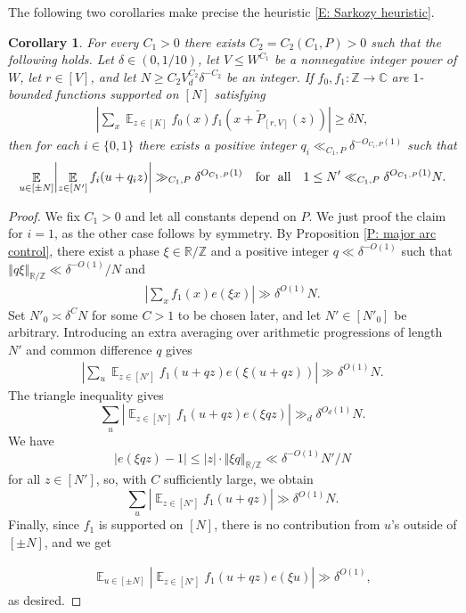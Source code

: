 \documentclass[11pt]{amsart}
\newtheorem{corollary}[lemma]{Corollary}
\theoremstyle{definition}
\DeclareMathOperator*{\E}{\mathbb{E}}
\newcommand{\C}{{\mathbb C}}
\newcommand{\R}{{\mathbb R}}
\newcommand{\Z}{{\mathbb Z}}
\newcommand{\norm}[1]{\left\Vert #1\right\Vert}
\newcommand{\abs}[1]{\mathopen{}\left| #1\mathclose{}\right|}
\begin{document}
The following two corollaries make precise the heuristic \eqref{E: Sarkozy heuristic}.
\begin{corollary}\label{C: 1-dim Sarkozy}
        For every $C_1>0$ there exists $C_2 = C_2(C_1, P)>0$ such that the following holds. Let $\delta\in(0, 1/10)$, let $V\leq W^{C_1}$ be a nonnegative integer power of $W$, let $r\in[V]$, and let $N\geq C_2 V_d^{C_2}\delta^{-C_2}$ be an integer. If $f_0, f_1:\Z\to\C$ are $1$-bounded functions supported on $[N]$ satisfying
    \begin{align*}
        \abs{\sum_x \E_{z\in[K]}f_0(x) f_1(x+\widetilde{P}_{[r, V]}(z))}\geq \delta N,
    \end{align*}
    then for each $i\in\{0,1\}$ there exists a positive integer  $q_i\ll_{C_1, P} \delta^{-O_{C_1, P}(1)}$ such that %
    \begin{align*}
        \E_{u\in [\pm N]}\abs{\E_{z\in[N']} f_i(u + q_i z)}\gg_{C_1, P} \delta^{O_{C_1, P}(1)} \quad\textrm{for\; all}\quad 1\leq N'\ll_{C_1, P} \delta^{O_{C_1, P}(1)} N.
    \end{align*}
\end{corollary}
\begin{proof}
    We fix $C_1>0$ and let all constants depend on $P$. We just proof the claim for $i=1$, as the other case follows by symmetry. By Proposition \ref{P: major arc control}, there exist a phase $\xi\in\R/\Z$ and a positive integer $q\ll \delta^{-O(1)}$ such that $\norm{q\xi}_{\R/\Z}\ll\delta^{-O(1)}/N$ 
    and 
    \begin{align*}
        \abs{\sum_x f_1(x)e(\xi x)}\gg \delta^{O(1)}N.
    \end{align*}
    Set $N'_0 \asymp \delta^C N$ for some $C>1$ to be chosen later, and let $N'\in[N'_0]$ be arbitrary. Introducing an extra averaging over arithmetic progressions of length $N'$ and common difference $q$ gives
    \begin{align*}
        \abs{\sum_{u}\E_{z\in[N']} f_1(u+qz)e(\xi (u+qz))}\gg \delta^{O(1)}N.
    \end{align*} 
    The triangle inequality gives
    $$\sum_u \abs{\E_{z\in[N']} f_1(u+qz)e(\xi qz)}\gg_d \delta^{O_d(1)}N.$$
    We have
    $$|e(\xi qz)-1| \leq |z| \cdot \norm{\xi q}_{\R/\Z}\ll \delta^{-O(1)}N'/N$$
    for all $z \in [N']$, so, with $C$ sufficiently large, we obtain
    $$\sum_u \abs{\E_{z\in[N']} f_1(u+qz)}\gg \delta^{O(1)}N.$$
    Finally, since $f_1$ is supported on $[N]$, there is no contribution from $u$'s outside of $[\pm N]$, and we get

    \begin{align*}
        \E_{u\in [\pm N]} \abs{\E_{z\in[N']} f_1(u+qz)e(\xi u)}\gg \delta^{O(1)},
    \end{align*}      
    as desired.
\end{proof}
\end{document}

